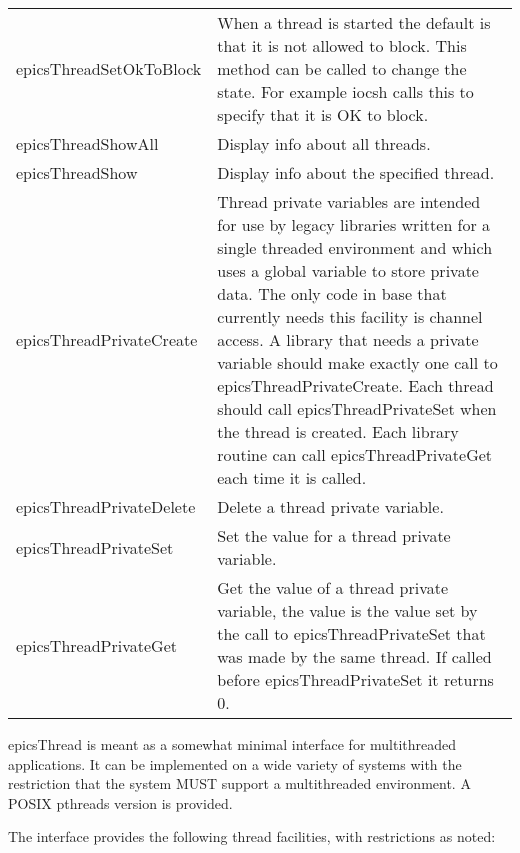 \begin{center}
\begin{longtable}{p{2.375in}p{4.0in}}
epicsThreadSetOkToBlock & When a thread is started the default is that it is not allowed to block. This method can be called to change the state. For example iocsh calls this to specify that it is OK to block.\\
epicsThreadShowAll & Display info about all threads.\\
epicsThreadShow & Display info about the specified thread.\\
epicsThreadPrivateCreate & Thread private variables are intended for use by legacy libraries written for a single threaded environment and which uses a global variable to store private data. The only code in base that currently needs this facility is channel access. A library that needs a private variable should make exactly one call to epicsThreadPrivateCreate. Each thread should call epicsThreadPrivateSet when the thread is created. Each library routine can call epicsThreadPrivateGet each time it is called.\\
epicsThreadPrivateDelete & Delete a thread private variable.\\
epicsThreadPrivateSet & Set the value for a thread private variable. \\
epicsThreadPrivateGet & Get the value of a thread private variable, the value is the value set by the call to epicsThreadPrivateSet that was made by the same thread. If called before epicsThreadPrivateSet it returns 0.
\end{longtable}

\end{center}


epicsThread is meant as a somewhat minimal interface for multithreaded applications. It can be implemented on a wide 
variety of systems with the restriction that the system MUST support a multithreaded environment. A POSIX pthreads 
version is provided.

The interface provides the following thread facilities, with restrictions as noted:

